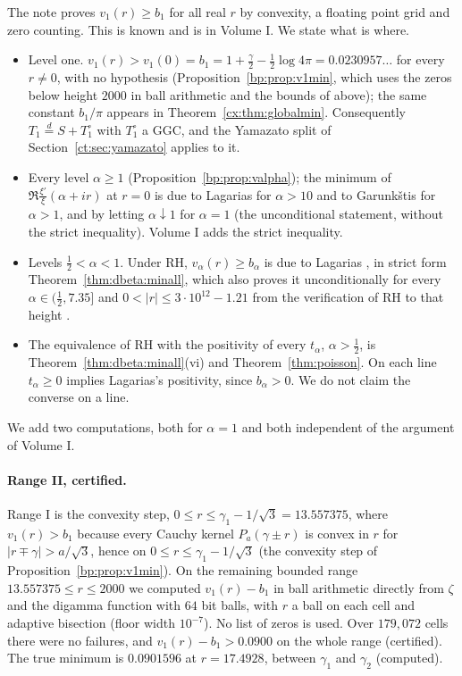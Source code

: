 The note proves $v_1(r)\ge b_1$ for all real $r$ by convexity, a floating point grid and zero counting. This is known and is in Volume I. We state what is where.
\begin{itemize}
\item Level one. $v_1(r)>v_1(0)=b_1=1+\frac\gamma2-\frac12\log4\pi=0.0230957\ldots$ for every $r\ne0$, with no hypothesis (Proposition~\ref{bp:prop:v1min}, which uses the zeros below height $2000$ in ball arithmetic and the bounds of \cite{HSW22} above); the same constant $b_1/\pi$ appears in Theorem~\ref{cx:thm:globalmin}. Consequently $T_1\stackrel d=S+T_1^\circ$ with $T_1^\circ$ a GGC, and the Yamazato split of Section~\ref{ct:sec:yamazato} applies to it.
\item Every level $\alpha\ge1$ (Proposition~\ref{bp:prop:valpha}); the minimum of $\Re\frac{\xi'}{\xi}(\alpha+ir)$ at $r=0$ is due to Lagarias \cite{Lagarias} for $\alpha>10$ and to Garunk\v{s}tis \cite{Garunkstis02} for $\alpha>1$, and by letting $\alpha\downarrow1$ for $\alpha=1$ (the unconditional statement, without the strict inequality). Volume I adds the strict inequality.
\item Levels $\frac12<\alpha<1$. Under RH, $v_\alpha(r)\ge b_\alpha$ is due to Lagarias \cite{Lagarias}, in strict form Theorem~\ref{thm:dbeta:minall}, which also proves it unconditionally for every $\alpha\in(\frac12,7.35]$ and $0<|r|\le3\cdot10^{12}-1.21$ from the verification of RH to that height \cite{PT21}.
\item The equivalence of RH with the positivity of every $t_\alpha$, $\alpha>\frac12$, is Theorem~\ref{thm:dbeta:minall}(vi) and Theorem~\ref{thm:poisson}. On each line $t_\alpha\ge0$ implies Lagarias's positivity, since $b_\alpha>0$. We do not claim the converse on a line.
\end{itemize}

We add two computations, both for $\alpha=1$ and both independent of the argument of Volume I.

\paragraph{Range II, certified.} Range I is the convexity step, $0\le r\le\gamma_1-1/\sqrt3=13.557375$, where $v_1(r)>b_1$ because every Cauchy kernel $P_a(\gamma\pm r)$ is convex in $r$ for $|r\mp\gamma|>a/\sqrt3$, hence on $0\le r\le\gamma_1-1/\sqrt3$ (the convexity step of Proposition~\ref{bp:prop:v1min}). On the remaining bounded range $13.557375\le r\le2000$ we computed $v_1(r)-b_1$ in ball arithmetic directly from $\zeta$ and the digamma function with $64$ bit balls, with $r$ a ball on each cell and adaptive bisection (floor width $10^{-7}$). No list of zeros is used. Over $179{,}072$ cells there were no failures, and $v_1(r)-b_1>0.0900$ on the whole range (certified). The true minimum is $0.0901596$ at $r=17.4928$, between $\gamma_1$ and $\gamma_2$ (computed).

